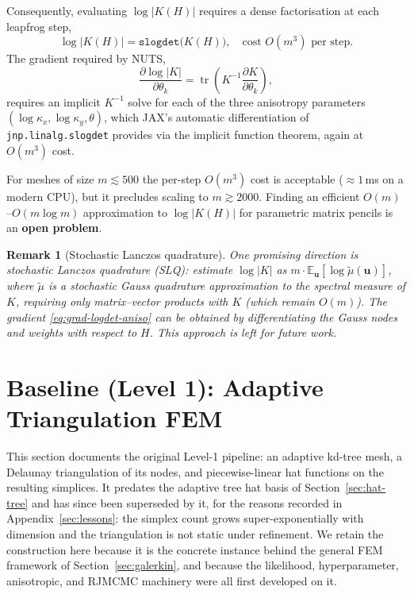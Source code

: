 \documentclass[11pt]{article}
\newtheorem{remark}{Remark}
\DeclareMathOperator{\tr}{tr}
\newcommand{\E}{\mathbb{E}}
\begin{document}
Consequently, evaluating $\log|K(H)|$ requires a dense factorisation at each
leapfrog step,
\begin{equation}
  \log|K(H)| = \texttt{slogdet}\bigl(K(H)\bigr),
  \quad\text{cost } O(m^3) \text{ per step.}
  \label{eq:slogdet-aniso}
\end{equation}
The gradient required by NUTS,
\begin{equation}
  \frac{\partial\log|K|}{\partial\theta_k}
  = \tr\!\left(K^{-1}\frac{\partial K}{\partial\theta_k}\right),
  \label{eq:grad-logdet-aniso}
\end{equation}
requires an implicit $K^{-1}$ solve for each of the three anisotropy
parameters $(\log\kappa_x, \log\kappa_y, \theta)$, which JAX's automatic
differentiation of \texttt{jnp.linalg.slogdet} provides via the implicit
function theorem, again at $O(m^3)$ cost.

For meshes of size $m \lesssim 500$ the per-step $O(m^3)$ cost is acceptable
($\approx\!1$\,ms on a modern CPU), but it precludes scaling to
$m \gtrsim 2000$.  Finding an efficient $O(m)$--$O(m\log m)$ approximation
to $\log|K(H)|$ for parametric matrix pencils is an \textbf{open problem}.

\begin{remark}[Stochastic Lanczos quadrature]
One promising direction is \emph{stochastic Lanczos quadrature} (SLQ):
estimate $\log|K|$ as $m\cdot\E_{\mathbf{u}}[\log\tilde\mu(\mathbf{u})]$,
where $\tilde\mu$ is a stochastic Gauss quadrature approximation to the
spectral measure of $K$, requiring only matrix--vector products with $K$
(which remain $O(m)$).  The gradient \eqref{eq:grad-logdet-aniso} can be
obtained by differentiating the Gauss nodes and weights with respect to $H$.
This approach is left for future work.
\end{remark}

\section{Baseline (Level 1): Adaptive Triangulation FEM}
\label{sec:baseline}
\label{sec:adaptive-tri}

This section documents the original Level-1 pipeline: an adaptive kd-tree mesh,
a Delaunay triangulation of its nodes, and piecewise-linear hat functions on the
resulting simplices.  It predates the adaptive tree hat basis of
Section~\ref{sec:hat-tree} and has since been superseded by it, for the reasons
recorded in Appendix~\ref{sec:lessons}: the simplex count grows
super-exponentially with dimension and the triangulation is not static under
refinement.  We retain the construction here because it is the concrete instance
behind the general FEM framework of Section~\ref{sec:galerkin}, and because the
likelihood, hyperparameter, anisotropic, and RJMCMC machinery were all first
developed on it.
\end{document}
